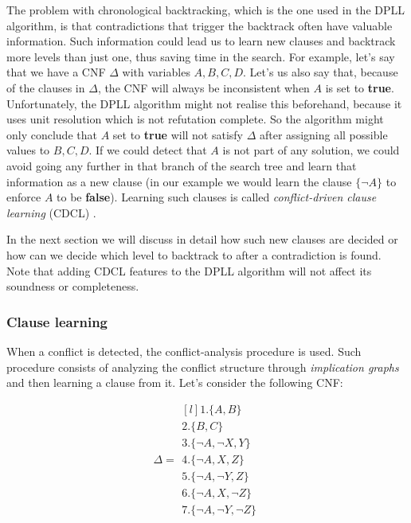 \documentclass[12pt]{diicc}
\begin{document}
The problem with chronological backtracking, which is the one used in the DPLL algorithm, is that contradictions that trigger the backtrack often have valuable information. Such information could lead us to learn new clauses and backtrack more levels than just one, thus saving time in the search. For example, let's say that we have a CNF $\Delta$ with variables $A,B,C,D$. Let's us also say that, because of the clauses in $\Delta$, the CNF will always be inconsistent when $A$ is set to \textbf{true}. Unfortunately, the DPLL algorithm might not realise this beforehand, because it uses unit resolution which is not refutation complete. So the algorithm might only conclude that $A$ set to \textbf{true} will not satisfy $\Delta$ after assigning all possible values to $B,C,D$. If we could detect that $A$ is not part of any solution, we could avoid going any further in that branch of the search tree and learn that information as a new clause (in our example we would learn the clause $\{\neg A\}$ to enforce $A$ to be \textbf{false}). Learning such clauses is called \textit{conflict-driven clause learning} (CDCL) \cite{cdcl1,cdcl2}.

In the next section we will discuss in detail how such new clauses are decided or how can we decide which level to backtrack to after a contradiction is found. Note that adding CDCL features to the DPLL algorithm will not affect its soundness or completeness.

\subsubsection{Clause learning}

When a conflict is detected, the conflict-analysis procedure is used. Such procedure consists of analyzing the conflict structure through \textit{implication graphs} and then learning a clause from it. Let's consider the following CNF:

\begin{equation}\label{row sum}
\Delta = \begin{matrix*}[l]
			1.\{A,B\}\\
		 	2.\{B,C\}\\
		 	3.\{\neg A,\neg X,Y\}\\
		 	4.\{\neg A,X,Z\}\\
		 	5.\{\neg A,\neg Y,Z\}\\
		 	6.\{\neg A,X,\neg Z\}\\
		 	7.\{\neg A,\neg Y,\neg Z\}
		 \end{matrix*}
\end{equation}
\end{document}
